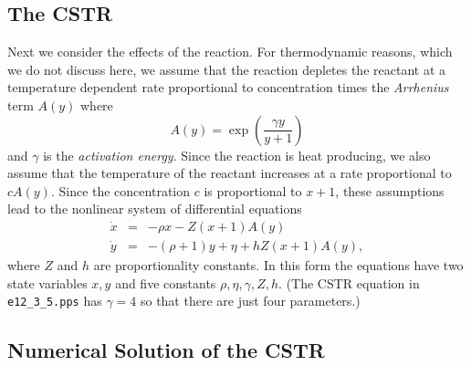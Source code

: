 \subsection*{The CSTR}
 
Next we consider the effects of the reaction.  For thermodynamic
reasons, which we do not discuss here, we assume that the
reaction depletes the reactant at a temperature dependent rate
proportional to concentration times the {\em Arrhenius\/} term
 $A(y)$ where
\[
A(y) = \exp\left(\frac{\gamma y}{y+1}\right)
\]
and $\gamma$ is the {\em activation 
energy\/}.  Since the
reaction is heat producing, we also assume that the temperature
of the reactant increases at a rate proportional to $cA(y)$.
Since the concentration $c$ is proportional to $x+1$, these
assumptions lead to the nonlinear system of differential
equations
\begin{equation*} \label{e:CSTR}
\begin{array}{rcl}
\dot{x} & = & -\rho x  - Z(x+1)A(y) \\
\dot{y} & = & -(\rho+1)y + \eta + hZ(x+1)A(y),
\end{array}
\end{equation*}
where $Z$ and $h$ are proportionality constants.  In this form
the equations have two state variables $x,y$ and five constants
$\rho,\eta,\gamma,Z,h$.  (The CSTR equation in {\tt e12\_3\_5.pps} has
$\gamma=4$ so that there are just four parameters.)

\subsection*{Numerical Solution of the CSTR}


